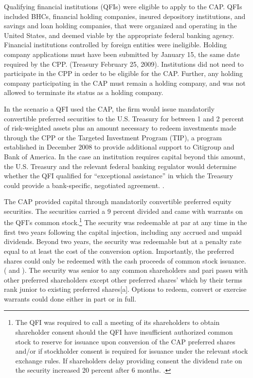 \documentclass[12pt]{article}
\begin{document}
Qualifying financial institutions (QFIs) were eligible to apply to the CAP. QFIs included BHCs, financial holding companies, insured depository institutions, and savings and loan holding companies, that were organized and operating in the United States, and deemed viable by the appropriate federal banking agency. Financial institutions controlled by foreign entities were ineligible. Holding company applications must have been submitted by January 15, the same date required by the CPP. (Treasury February 25, 2009). Institutions did not need to participate in the CPP in order to be eligible for the CAP. Further, any holding company participating in the CAP must remain a holding company, and was not allowed to terminate its status as a holding company.


In the scenario a QFI used the CAP, the firm would issue mandatorily convertible preferred securities to the U.S. Treasury for between 1 and 2 percent of risk-weighted assets plus an amount necessary to redeem investments made through the CPP or the Targeted Investment Program (TIP), a program established in December 2008 to provide additional support to Citigroup and Bank of America. In the case an institution requires capital beyond this amount, the U.S. Treasury and the relevant federal banking regulator would determine whether the QFI qualified for “exceptional assistance'' in which the Treasury could provide a bank-specific, negotiated agreement. \citep{WhitePaper}.


The CAP provided capital through mandatorily convertible preferred equity securities. The securities carried a 9 percent divided and came with warrants on the QFI's common stock.\footnote{The QFI was required to call a meeting of its shareholders to obtain shareholder consent should the QFI have insufficient authorized common stock to reserve for issuance upon conversion of the CAP preferred shares and/or if stockholder consent is required for issuance under the relevant stock exchange rules. If shareholders delay providing consent the dividend rate on the security increased 20 percent after 6 months. \citep{CAPTerms}.} The security was redeemable at par at any time in the first two years following the capital injection, including any accrued and unpaid dividends. Beyond two years, the security was redeemable but at a penalty rate equal to at least the cost of the conversion option. Importantly, the preferred shares could only be redeemed with the cash proceeds of common stock issuance. (\citet{WhitePaper} and \citet{GW}). The security was senior to any common shareholders and pari passu with other preferred shareholders except other preferred shares' which by their terms rank junior to existing preferred shares[a]. Options to redeem, convert or exercise warrants could done either in part or in full.
\end{document}
